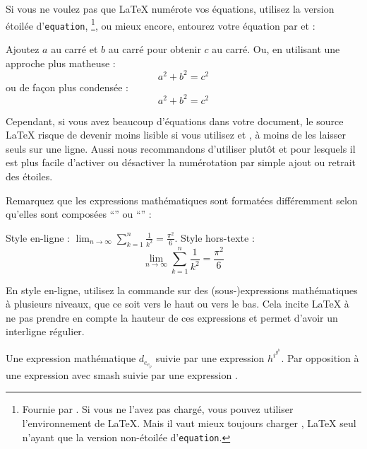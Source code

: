 Si vous ne voulez pas que \LaTeX{} numérote vos équations, utilisez la
version étoilée d'\texttt{equation}, \footnote{Fournie par
  . Si vous ne l'avez pas chargé, vous pouvez utiliser
  l'environnement  de \LaTeX{}. Mais il vaut mieux toujours
  charger , \LaTeX{} seul n'ayant que la version
  non-étoilée d'\texttt{equation}.}, ou mieux encore,
entourez votre équation par \ci{[} et \ci{]} :
\begin{example}
Ajoutez $a$ au carré
et $b$ au carré pour obtenir
$c$ au carré. Ou, en
utilisant une approche plus
matheuse :
\begin{equation*}
  a^2 + b^2 = c^2
\end{equation*}
ou de façon plus condensée :
\[ a^2 + b^2 = c^2 \]
\end{example}

Cependant, si vous avez beaucoup d'équations dans votre document, le source
\LaTeX{} risque de devenir moins lisible si vous utilisez \ci{[\iffalse]\fi}
et \ci{\iffalse[\fi]}, à moins de les laisser seuls sur une
ligne. Aussi nous recommandons d'utiliser plutôt  et
 pour lesquels il est plus facile d'activer ou
désactiver la numérotation par simple ajout ou retrait des étoiles.

Remarquez que les expressions mathématiques sont formatées
différemment selon qu'elles sont composées \enquote{} ou
\enquote{} :
 \begin{example}
Style en-ligne :
$\lim_{n \to \infty}
\sum_{k=1}^n \frac{1}{k^2}
= \frac{\pi^2}{6}$.
Style hors-texte :
\begin{equation}
  \lim_{n \to \infty}
  \sum_{k=1}^n \frac{1}{k^2}
  = \frac{\pi^2}{6}
\end{equation}
\end{example}

En style en-ligne, utilisez la commande  sur des
(sous-)expressions mathématiques à plusieurs niveaux, que ce soit vers
le haut ou vers le bas. Cela incite \LaTeX{} à ne pas prendre en
compte la hauteur de ces expressions et permet d'avoir un interligne
régulier.

\begin{example}
Une expression mathématique
$d_{e_{e_p}}$ suivie par une
expression $h^{i^{g^h}}$. Par
opposition à une expression
avec smash 
suivie par une expression
.
\end{example}


